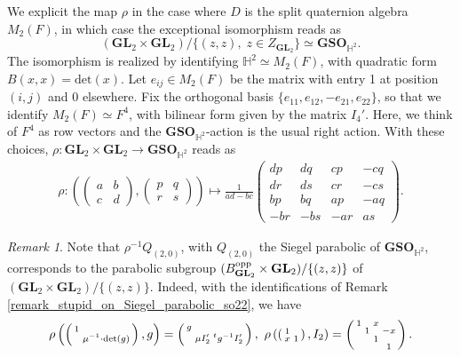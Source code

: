 \documentclass[11pt, reqno]{amsart}
\theoremstyle{plain}
\theoremstyle{definition}
\theoremstyle{remark}
\newtheorem{remark}[theorem]{Remark}
\theoremstyle{plain}
\def\det{\mathrm{det}}
\def\GSO{{\mathbf{GSO}}}
\def\GL{\mathbf{GL}}
\begin{document}
We explicit the map $\rho$ in the case where $D$ is the split quaternion algebra $M_2(F)$, in which case the exceptional isomorphism reads as 
\[(\GL_2\times \GL_2)/\{(z,z),\;z\in Z_{\GL_2}\} \simeq \GSO_{\mathbb{H}^2}. \]
The isomorphism is realized by identifying $\mathbb{H}^2\simeq M_2(F)$, with quadratic form $B(x,x)=\det (x)$. Let $e_{ij} \in M_2(F)$ be the matrix with entry 1 at position $(i,j)$ and $0$ elsewhere. Fix the orthogonal basis $\{ e_{11}, e_{12}, -e_{21}, e_{22}\}$, so that we identify  $M_2(F) \simeq F^4$, with bilinear form given by the matrix  $I_4'$.
Here, we think of $F^4$ as row vectors and the $\mathbf{GSO}_{\mathbb{H}^2}$-action is the usual right action. With these choices, $\rho : \GL_2 \times \GL_2 \to \mathbf{GSO}_{\mathbb{H}^2}$ reads as \begin{align}\label{eq:exceptionalisomorphismsplit} 
    \rho:\left( \left(\begin{smallmatrix}
    a & b \\ c & d
\end{smallmatrix} \right), \left(\begin{smallmatrix}
    p & q \\ r & s
\end{smallmatrix} \right) \right) \mapsto
 \tfrac{1}{ad-bc}\left(
\begin{smallmatrix}
d p & d q & c p & -c q\\
d r & d s & c r & -c s\\
b p & b q & a p & - a q\\
-b r & -b s & - a r & a s
\end{smallmatrix}
\right).
\end{align}
\begin{remark}\label{Remark:Siegel:Parabolic:Exceptional}
    Note that $\rho^{-1}Q_{(2,0)}$, with $Q_{(2,0)}$  the Siegel parabolic of $\mathbf{GSO}_{\mathbb{H}^2}$, corresponds to the parabolic subgroup $(B_{\GL_2}^{\rm opp} \times \GL_2) /\{ (z,z)\}$ of $(\GL_2 \times \GL_2)/\{ (z,z)\}$. Indeed, with the identifications of Remark \ref{remark_stupid_on_Siegel_parabolic_so22}, we have
\[\rho \left( \left(\begin{smallmatrix}
    1 &  \\  & {\mu}^{-1} \cdot {\rm det}(g) 
\end{smallmatrix} \right), g \right) =  \left(\begin{smallmatrix} g  & \\ &\mu I_2'\;^{t}g^{-1}I_2'\end{smallmatrix}\right),\, \,  \rho \left( \left(\begin{smallmatrix}
    1 &  \\ x & 1 
\end{smallmatrix} \right), I_2 \right) = \left(\begin{smallmatrix} 1 & & x & \\ & 1 & & -x\\ & & 1 & \\ & & & 1 \end{smallmatrix}\right). \]
\end{remark}
\end{document}
